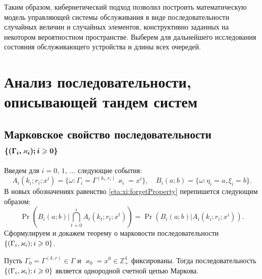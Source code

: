 \documentclass[a4paper,12pt,russian]{extarticle}
\newcommand{\Mark}{\{(\Gamma_i, \varkappa_i); \hm{} i \geqslant 0\}}
\newcommand{\MarkThree}{\{(\Gamma_i, \varkappa_{3,i}); \hm{} i \geqslant 0\}}
\begin{document}
Таким образом, кибернетический подход позволил построить математическую модель управляющей системы обслуживания в виде последовательности случайных величин и случайных элементов, конструктивно заданных на некотором вероятностном пространстве. Выберем для дальнейшего исследования состояния обслуживающего устройства и длины всех очередей.

\section{Анализ последовательности, описывающей тандем систем}

\subsection[Марковское свойство последовательности $\boldsymbol{\Mark}$]%
{Марковское свойство последовательности $\boldsymbol{\Mark}$}


Введем для $i=0$, $1$, $\ldots$ следующие события:
\begin{equation*}
A_i(k_i;r_i;x^i) = \{\omega\colon\Gamma_i=\Gamma^{(k_i,r_i)}\varkappa_i=x^i\}, \quad  B_i(a;b) = \{\omega\colon\eta_i=a, \xi_i=b\}.
\end{equation*}
В новых обозначениях равенство \eqref{eta:xi:forgetProperty}  перепишется следующим образом:
\begin{equation}
\Pr (B_i(a;b) | \bigcap_{t=0}^{i} A_t(k_t;r_t;x^t)) = \Pr (B_i(a;b) |  A_i(k_i;r_i;x^i)).
\label{new:notation:eta:xi:forget}
\end{equation}
Сформулируем и докажем теорему о марковости последовательности $\Mark$.
\begin{theorem}
Пусть $\Gamma_0=\Gamma^{(k,r)}\in \Gamma$ и $\varkappa_0=x^0\in \mathbb{Z}_+^4$ фиксированы. Тогда последовательность $\Mark$ является однородной счетной цепью Маркова. 
\end{theorem}
\end{document}
